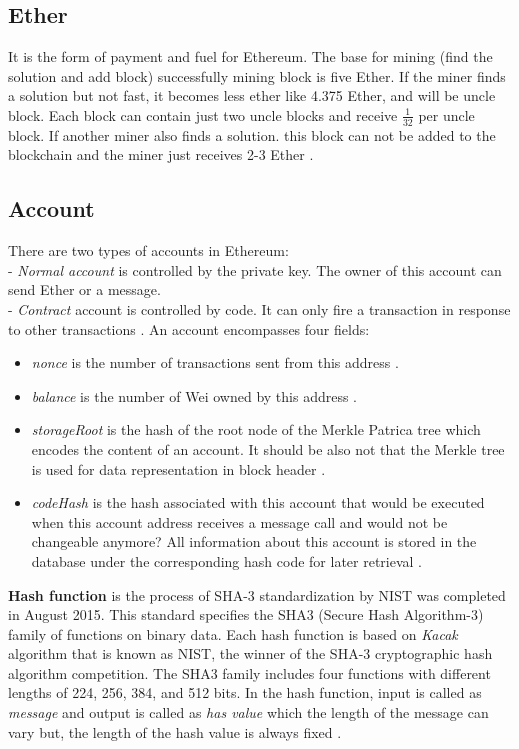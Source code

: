 \subsection{Ether}
 It is the form of payment and fuel for Ethereum. The base for mining (find the solution and add block) successfully mining block is five Ether. If the miner finds a solution but not fast, it becomes less ether like 4.375 Ether, and will be uncle block. Each block can contain just two uncle blocks and receive $\frac{1}{32}$ per uncle block. If another miner also finds a solution. this block can not be added to the blockchain and the miner just receives 2-3 Ether \cite{Egbertsen}. 
\subsection{Account}
There are two types of accounts in Ethereum:\\
- \textit{Normal account} is controlled by the private key. The owner of this account can send Ether or a message.\\
- \textit{Contract} account is controlled by code. It can only fire a transaction in response to other transactions \cite{Egbertsen}. An account encompasses four fields:\\
 \begin{itemize}
     \item \textit{nonce} is the number of transactions sent from this address \cite{Gavin}.
     \item \textit{balance} is the number of Wei owned by this address \cite{Gavin}.
     \item \textit{storageRoot} is the hash of the root node of the Merkle Patrica tree which encodes the content of an account. It should be also not that the Merkle tree is used for data representation in block header \cite{Gavin}.
     \item \textit{codeHash}
     is the hash associated with this account that would be executed when this account address receives a message call and would not be changeable anymore? All information about this account is stored in the database under the corresponding hash code for later retrieval \cite{Gavin}. \\
    
\end{itemize}
\textbf{Hash function}
is the process of SHA-3 standardization by NIST was completed in August 2015.
This standard specifies the SHA3 (Secure Hash Algorithm-3) family of functions on binary data. Each hash function is based on \textit{Kacak} algorithm that is known as NIST, the winner of the SHA-3 cryptographic hash algorithm competition. The SHA3 family includes four functions with different lengths of 224, 256, 384, and 512 bits. 
In the hash function, input is called as \textit{message} and output is called as  \textit{has value} which the length of the message can vary but, the length of the hash value is always fixed \cite{Fips}.\\

